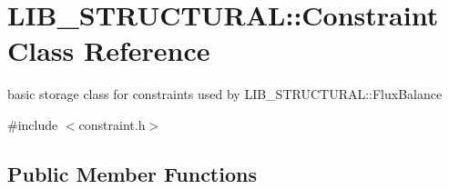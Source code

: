 \hypertarget{class_l_i_b___s_t_r_u_c_t_u_r_a_l_1_1_constraint}{}\section{L\+I\+B\+\_\+\+S\+T\+R\+U\+C\+T\+U\+R\+AL\+:\+:Constraint Class Reference}
\label{class_l_i_b___s_t_r_u_c_t_u_r_a_l_1_1_constraint}


basic storage class for constraints used by L\+I\+B\+\_\+\+S\+T\+R\+U\+C\+T\+U\+R\+A\+L\+::\+Flux\+Balance  




{\ttfamily \#include $<$constraint.\+h$>$}

\subsection*{Public Member Functions}
